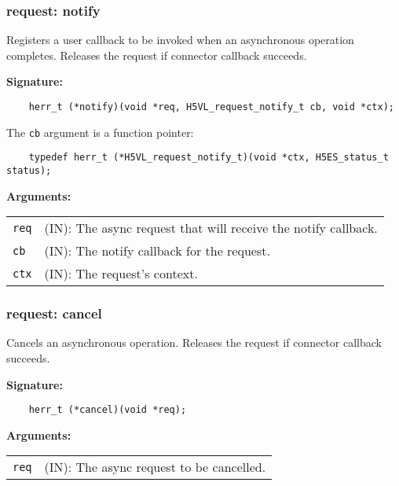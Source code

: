\subsubsection{request: notify}
Registers a user callback to be invoked when an asynchronous operation completes. Releases the request if connector callback succeeds.

\begin{mdframed}[style=bgbox]
\textbf{Signature:}
\begin{lstlisting}
    herr_t (*notify)(void *req, H5VL_request_notify_t cb, void *ctx);            
\end{lstlisting}

The \texttt{cb} argument is a function pointer:
\begin{lstlisting}
    typedef herr_t (*H5VL_request_notify_t)(void *ctx, H5ES_status_t status);
\end{lstlisting} 

\textbf{Arguments:}\\
\begin{tabular}{l p{13.5cm}}
  \texttt{req} & (IN): The async request that will receive the notify callback.\\
  \texttt{cb} & (IN): The notify callback for the request.\\
  \texttt{ctx} & (IN): The request's context.\\
\end{tabular}
\end{mdframed}

\subsubsection{request: cancel}
Cancels an asynchronous operation. Releases the request if connector callback succeeds.

\begin{mdframed}[style=bgbox]
\textbf{Signature:}
\begin{lstlisting}
    herr_t (*cancel)(void *req);                                                 
\end{lstlisting}

\textbf{Arguments:}\\
\begin{tabular}{l p{13.5cm}}
  \texttt{req} & (IN): The async request to be cancelled.\\
\end{tabular}
\end{mdframed}

